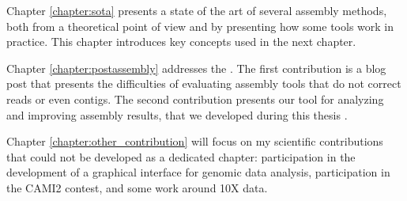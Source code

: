 \documentclass[./main.tex]{subfiles}
\begin{document}
Chapter \ref{chapter:sota} presents a state of the art of several assembly methods, both from a theoretical point of view and by presenting how some tools work in practice. This chapter introduces key concepts used in the next chapter.

Chapter \ref{chapter:postassembly} addresses the . The first contribution is a blog post that presents the difficulties of evaluating assembly tools that do not correct reads or even contigs. The second contribution 
 presents our tool for analyzing and improving assembly results, \knot that we developed during this thesis \cite{knot}.

Chapter \ref{chapter:other_contribution} will focus on my scientific contributions that could not be developed as a dedicated chapter: participation in the development of a graphical interface for genomic data analysis, participation in the CAMI2 contest, and some work around 10X data.

\end{document}
